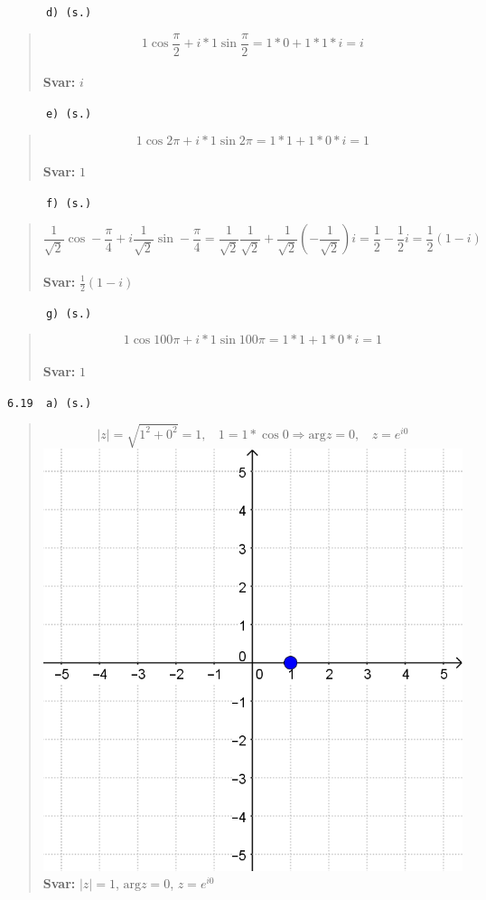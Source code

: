 \documentclass[a4paper]{article}
\newcommand{\tskcol}[1]{\textcolor{tskcol}{#1}}
\begin{document}
	\texttt{\tskcol{~~~~~~d) (s.)}}
	\begin{quotation}
		\noindent
		\[1\cos\frac{\pi}{2}+i*1\sin\frac{\pi}{2}=
		1*0+1*1*i=
		i\]
		\\
		\textbf{Svar:} $i$
	\end{quotation}
	
	\texttt{\tskcol{~~~~~~e) (s.)}}
	\begin{quotation}
		\noindent
		\[1\cos2\pi+i*1\sin2\pi=
		1*1+1*0*i=
		1\]
		\\
		\textbf{Svar:} $1$
	\end{quotation}
	
	\texttt{\tskcol{~~~~~~f) (s.)}}
	\begin{quotation}
		\noindent
		\[\frac{1}{\sqrt{2}}\cos-\frac{\pi}{4}+i\frac{1}{\sqrt{2}}\sin-\frac{\pi}{4}=
		\frac{1}{\sqrt{2}}\frac{1}{\sqrt{2}}+\frac{1}{\sqrt{2}}(-\frac{1}{\sqrt{2}})i=
		\frac{1}{2}-\frac{1}{2}i=
		\frac{1}{2}(1-i)\]
		\\
		\textbf{Svar:} $\frac{1}{2}(1-i)$
	\end{quotation}
	
	\texttt{\tskcol{~~~~~~g) (s.)}}
	\begin{quotation}
		\noindent
		\[1\cos100\pi+i*1\sin100\pi=
		1*1+1*0*i=
		1\]
		\\
		\textbf{Svar:} $1$
	\end{quotation}
	
	\pagebreak
	\texttt{\tskcol{6.19~~a) (s.)}}
	\begin{quotation}
		\noindent
		\[|z|=\sqrt{1^2+0^2}=1,~~~~ 1=1*\cos0 \Rightarrow \text{arg}z=0,~~~~ z=e^{i0}\]
		\includegraphics[scale=0.2]{images/619a.PNG}
		\\
		\textbf{Svar:} $|z|=1$, $\text{arg}z=0$, $z=e^{i0}$
	\end{quotation}
	
\end{document}
